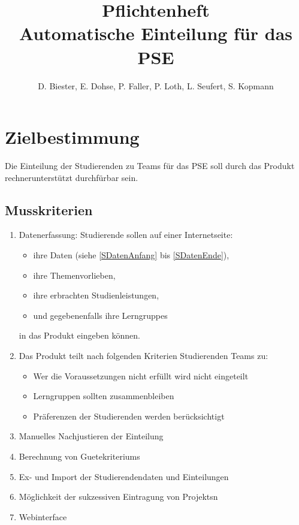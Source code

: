 \documentclass[parskip=full]{scrartcl}
\newcommand{\swtLabel}[1]{\textbf{\textbackslash #1\arabic*0\textbackslash}}
\begin{document}
\title{Pflichtenheft \\
        \large Automatische Einteilung für das PSE}

\author{D. Biester, E. Dohse, P. Faller, P. Loth, L. Seufert, S. Kopmann}
        
\maketitle
 
\pagebreak
\tableofcontents
\pagebreak

\section{Zielbestimmung}
Die Einteilung der Studierenden zu Teams für das \gls{PSE} soll durch das Produkt
rechnerunterstützt durchfürbar sein.


\subsection{Musskriterien}
 \begin{enumerate}[label=\swtLabel{M}]
   \item Datenerfassung: Studierende sollen auf einer Internetseite:   
   \begin{itemize}
     \item ihre Daten (siehe \ref{SDatenAnfang} bis \ref{SDatenEnde}),     
     \item ihre Themenvorlieben, 
     \item ihre erbrachten Studienleistungen,
     \item und gegebenenfalls ihre \glspl{Lerngruppe}
   \end{itemize}
   in das Produkt eingeben können.
   \item Das Produkt teilt nach folgenden Kriterien Studierenden Teams zu:
   \begin{itemize}
     \item Wer die Voraussetzungen nicht erfüllt wird nicht eingeteilt
     \item Lerngruppen sollten zusammenbleiben
     \item Präferenzen der Studierenden werden berücksichtigt
   \end{itemize}
   
   \item Manuelles Nachjustieren der Einteilung
   \item Berechnung von \glspl{Guetekriterium}
   \item Ex- und Import der Studierendendaten und
   Einteilungen %
   \item Möglichkeit der sukzessiven Eintragung von \glspl{Projekt}n
   \item Webinterface   
 \end{enumerate}
\end{document}

